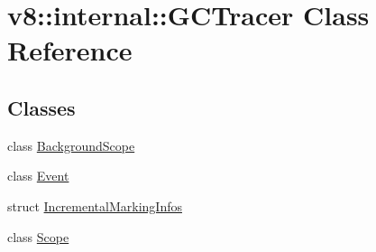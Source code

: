 \hypertarget{classv8_1_1internal_1_1GCTracer}{}\section{v8\+:\+:internal\+:\+:G\+C\+Tracer Class Reference}
\label{classv8_1_1internal_1_1GCTracer}
\subsection*{Classes}
\begin{DoxyCompactItemize}
\item 
class \mbox{\hyperlink{classv8_1_1internal_1_1GCTracer_1_1BackgroundScope}{Background\+Scope}}
\item 
class \mbox{\hyperlink{classv8_1_1internal_1_1GCTracer_1_1Event}{Event}}
\item 
struct \mbox{\hyperlink{structv8_1_1internal_1_1GCTracer_1_1IncrementalMarkingInfos}{Incremental\+Marking\+Infos}}
\item 
class \mbox{\hyperlink{classv8_1_1internal_1_1GCTracer_1_1Scope}{Scope}}
\end{DoxyCompactItemize}
